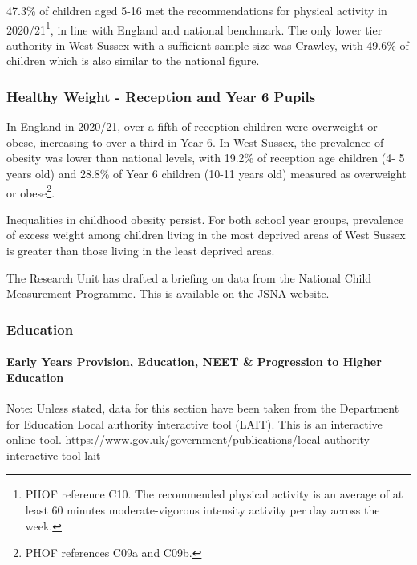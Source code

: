 47.3\% of children aged 5-16 met the recommendations for physical activity in 2020/21\footnote{PHOF reference C10. The recommended physical activity is an average of at least 60 minutes moderate-vigorous intensity activity per day across the week.}, in line with England and national benchmark. The only lower tier authority in West Sussex with a sufficient sample size was Crawley, with 49.6\% of children which is also similar to the national figure.

\subsubsection{Healthy Weight - Reception and Year 6 Pupils}
In England in 2020/21, over a fifth of reception children were overweight or obese, increasing to over a third in Year 6. In West Sussex, the prevalence of obesity was lower than national levels, with 19.2\% of reception age children (4- 5 years old) and 28.8\% of Year 6 children (10-11 years old) measured as overweight or obese\footnote{PHOF references C09a and C09b.}.


Inequalities in childhood obesity persist. For both school year groups, prevalence of excess weight among children living in the most deprived areas of West Sussex is greater than those living in the least deprived areas.

The Research Unit has drafted a briefing on data from the National Child Measurement Programme. This is available on the JSNA website.

\subsubsection{Education}
\paragraph{Early Years Provision, Education, NEET \& Progression to Higher Education}
Note: Unless stated, data for this section have been taken from the Department for Education Local authority interactive tool (LAIT). This is an interactive online tool. \url{https://www.gov.uk/government/publications/local-authority-interactive-tool-lait}


